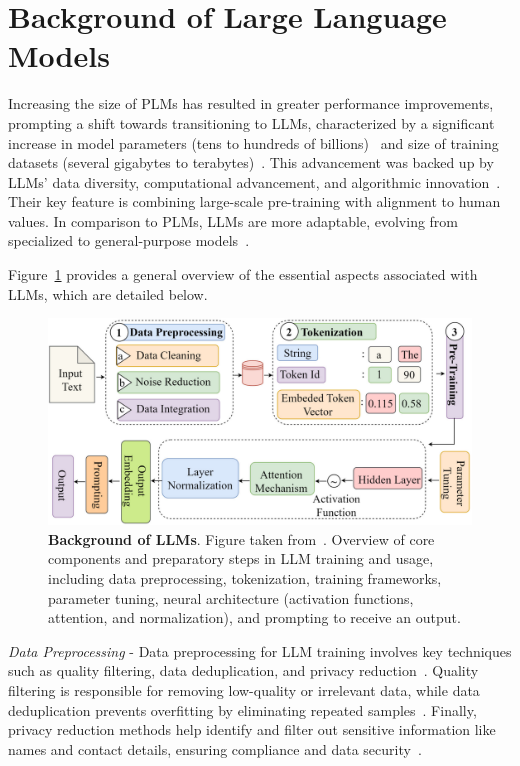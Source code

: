 \documentclass{DESSThesis}
\begin{document}
\section{Background of Large Language Models}

Increasing the size of PLMs has resulted in greater performance improvements, prompting a shift towards transitioning to LLMs, characterized by a significant increase in model parameters (tens to hundreds of billions)~\cite{review10433480} and size of training datasets (several gigabytes to terabytes)~\cite{naveed2024comprehensiveoverviewlargelanguage}. This advancement was backed up by LLMs' data diversity, computational advancement, and algorithmic innovation~\cite{wang2024historydevelopmentprincipleslarge}. Their key feature is combining large-scale pre-training with alignment to human values. In comparison to PLMs, LLMs are more adaptable, evolving from specialized to general-purpose models~\cite{wang2024historydevelopmentprincipleslarge}.

Figure~\ref{fig:llm_background} provides a general overview of the essential aspects associated with LLMs, which are detailed below.

\begin{figure}[H]
    \centering
    \includegraphics[width=0.9\linewidth]{img/Large Language Models and RAG/llm_background.png}
    \caption[Background of LLMs]{\textbf{Background of LLMs}. Figure taken from~\cite{review10433480}. Overview of core components and preparatory steps in LLM training and usage, including data preprocessing, tokenization, training frameworks, parameter tuning, neural architecture (activation functions, attention, and normalization), and prompting to receive an output.}
    \label{fig:llm_background}
\end{figure}
\noindent\emph{Data Preprocessing} - Data preprocessing for LLM training involves key techniques such as quality filtering, data deduplication, and privacy reduction~\cite{review10433480,naveed2024comprehensiveoverviewlargelanguage}. Quality filtering is responsible for removing low-quality or irrelevant data, while data deduplication prevents overfitting by eliminating repeated samples~\cite{review10433480}. Finally, privacy reduction methods help identify and filter out sensitive information like names and contact details, ensuring compliance and data security~\cite{review10433480,naveed2024comprehensiveoverviewlargelanguage}.
\end{document}
